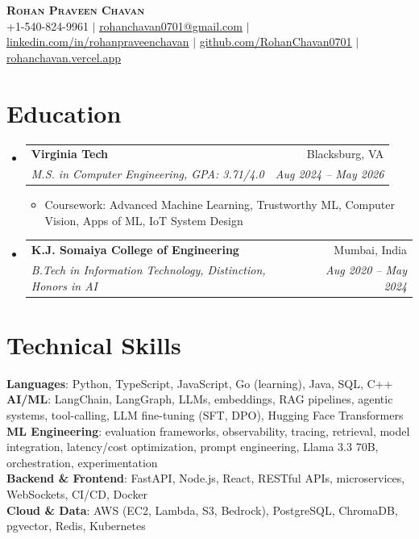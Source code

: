 \documentclass[letterpaper,10pt]{article}
\makeatletter
\newcommand{\resumeItem}[1]{\item\small{#1 \vspace{-2.5pt}}}
\newcommand{\resumeSubheading}[4]{
  \vspace{-2pt}\item
    \begin{tabular*}{0.97\textwidth}[t]{l@{\extracolsep{\fill}}r}
      \textbf{#1} & #2 \\
      \textit{\small#3} & \textit{\small #4} \\
    \end{tabular*}\vspace{-7pt}
}
\newcommand{\resumeSubHeadingListStart}{\begin{itemize}[leftmargin=0.15in, label={}]}
\newcommand{\resumeSubHeadingListEnd}{\end{itemize}}
\newcommand{\resumeItemListStart}{\begin{itemize}}
\newcommand{\resumeItemListEnd}{\end{itemize}\vspace{-5pt}}
\makeatother
\begin{document}
\begin{center}
    \textbf{\Huge \scshape Rohan Praveen Chavan} \\ \vspace{2pt}
    \small +1-540-824-9961 $|$
    \href{mailto:rohanchavan0701@gmail.com}{\underline{rohanchavan0701@gmail.com}} $|$
    \href{https://linkedin.com/in/rohanpraveenchavan}{\underline{linkedin.com/in/rohanpraveenchavan}} $|$
    \href{https://github.com/RohanChavan0701}{\underline{github.com/RohanChavan0701}} $|$
    \href{https://rohanchavan.vercel.app}{\underline{rohanchavan.vercel.app}}
\end{center}

\section{Education}
\resumeSubHeadingListStart
    \resumeSubheading
      {Virginia Tech}{Blacksburg, VA}
      {M.S. in Computer Engineering, GPA: 3.71/4.0}{Aug 2024 -- May 2026}
      \resumeItemListStart
        \resumeItem{Coursework: Advanced Machine Learning, Trustworthy ML, Computer Vision, Apps of ML, IoT System Design}
      \resumeItemListEnd
    \resumeSubheading
      {K.J. Somaiya College of Engineering}{Mumbai, India}
      {B.Tech in Information Technology, Distinction, Honors in AI}{Aug 2020 -- May 2024}
\resumeSubHeadingListEnd

\section{Technical Skills}
\begin{itemize}[leftmargin=0.15in, label={}]
    \small{\item{
     \textbf{Languages}{: Python, TypeScript, JavaScript, Go (learning), Java, SQL, C++} \\
     \textbf{AI/ML}{: LangChain, LangGraph, LLMs, embeddings, RAG pipelines, agentic systems,
       tool-calling, LLM fine-tuning (SFT, DPO), Hugging Face Transformers} \\
     \textbf{ML Engineering}{: evaluation frameworks, observability, tracing, retrieval, model integration,
       latency/cost optimization, prompt engineering, Llama 3.3 70B, orchestration, experimentation} \\
     \textbf{Backend \& Frontend}{: FastAPI, Node.js, React, RESTful APIs, microservices,
       WebSockets, CI/CD, Docker} \\
     \textbf{Cloud \& Data}{: AWS (EC2, Lambda, S3, Bedrock), PostgreSQL, ChromaDB, pgvector, Redis, Kubernetes}
    }}
\end{itemize}
\end{document}
